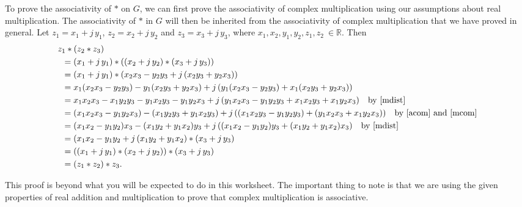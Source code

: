 To prove the associativity of $*$ on $G$, we can first prove the associativity of complex multiplication using our assumptions about real multiplication. The associativity of $*$ in $G$ will then be inherited from the associativity of complex multiplication that we have proved in general. Let $z_{1}=x_{1}+j\,y_{1}$, $z_{2}=x_{2}+j\,y_{2}$ and $z_{3}=x_{3}+j\,y_{3}$, where $x_{1},x_{2},y_{1},y_{2},z_{1},z_{2}\:\in \mathbb{R}$. Then
\begin{align*}
 &z_{1}*(z_{2}*z_{3})\\
 &\hspace{5pt}=(x_{1}+j\,y_{1})*\left((x_{2}+j\,y_{2})*(x_{3}+j\,y_{3})\right)\\
 &\hspace{5pt}=(x_{1}+j\,y_{1})*(x_{2}x_{3}-y_{2}y_{3}+j\,(x_{2}y_{3}+y_{2}x_{3}))\\
 &\hspace{5pt}=x_{1}(x_{2}x_{3}-y_{2}y_{3})-y_{1}(x_{2}y_{3}+y_{2}x_{3})+j\,(y_{1}(x_{2}x_{3}-y_{2}y_{3})+x_{1}(x_{2}y_{3}+y_{2}x_{3}))\\
 &\hspace{5pt}=x_{1}x_{2}x_{3}-x_{1}y_{2}y_{3}-y_{1}x_{2}y_{3}-y_{1}y_{2}x_{3}+j\,(y_{1}x_{2}x_{3}-y_{1}y_{2}y_{3}+x_{1}x_{2}y_{3}+x_{1}y_{2}x_{3}) \hspace{10pt} \text{by \eqref{mdist}} \\
 &\hspace{5pt}=(x_{1}x_{2}x_{3}-y_{1}y_{2}x_{3})-(x_{1}y_{2}y_{3}+y_{1}x_{2}y_{3})+j\,((x_{1}x_{2}y_{3}-y_{1}y_{2}y_{3})+(y_{1}x_{2}x_{3}+x_{1}y_{2}x_{3})) \hspace{10pt} \text{by \eqref{acom} and \eqref{mcom}} \\
 &\hspace{5pt}=(x_{1}x_{2}-y_{1}y_{2})x_{3}-(x_{1}y_{2}+y_{1}x_{2})y_{3}+j\,((x_{1}x_{2}-y_{1}y_{2})y_{3}+(x_{1}y_{2}+y_{1}x_{2})x_{3})\hspace{10pt} \text{by \eqref{mdist}}\\
 &\hspace{5pt}=(x_{1}x_{2}-y_{1}y_{2}+j\,(x_{1}y_{2}+y_{1}x_{2})*(x_{3}+j\,y_{3})\\
 &\hspace{5pt}=((x_{1}+j\,y_{1})*(x_{2}+j\,y_{2}))*(x_{3}+j\,y_{3})\\
 &\hspace{5pt}=(z_{1}*z_{2})*z_{3}.
 \end{align*}

This proof is beyond what you will be expected to do in this worksheet. The important thing to note is that we are using the given properties of real addition and multiplication to prove that complex multiplication is associative.
